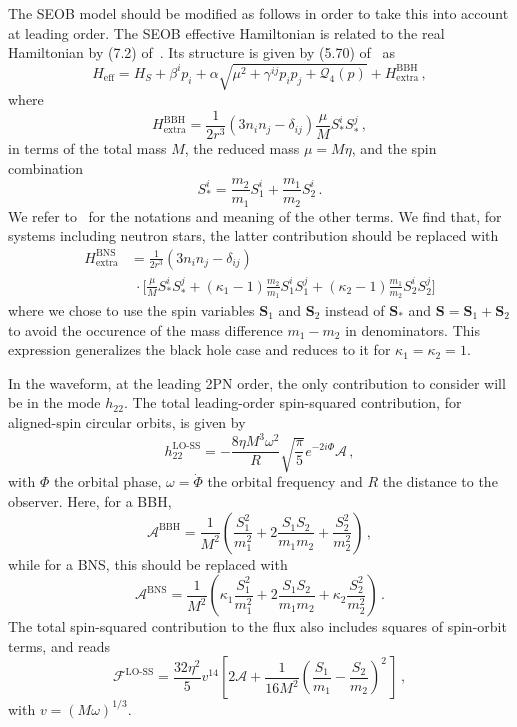 \documentclass[prd,aps,letter,twocolumn,floatfix,notitlepage,nofootinbib]{revtex4-1}
\newcommand{\be}{\begin{equation}}
\newcommand{\ee}{\end{equation}}
\newcommand{\nnm}{\nonumber}
\newcommand{\mr}{\mathrm}
\newcommand{\tr}{\textrm}
\newcommand{\mc}{\mathcal}
\newcommand{\bs}{\boldsymbol}
\begin{document}
The SEOB model should be modified as follows in order to take this into account at leading order. The SEOB effective Hamiltonian is related to the real Hamiltonian by (7.2) of~\cite{Barausse:2009xi}. Its structure is given by (5.70) of~\cite{Barausse:2009xi} as
\be
H_\mr{eff}=H_S+\beta^ip_i+\alpha\sqrt{\mu^2+\gamma^{ij}p_ip_j+\mc Q_4(p)}+H^\mr{BBH}_\mr{extra} \,,
\ee
where
\be
H^\mr{BBH}_\mr{extra}=\frac{1}{2r^3}(3n_in_j-\delta_{ij})\frac{\mu}{M}S_*^iS_*^j \,,
\ee
in terms of the total mass $M$, the reduced mass $\mu = M \eta$, and the spin combination
\be	
	S_*^i=\frac{m_2}{m_1} S_1^i+\frac{m_1}{m_2}S_2^i \,.
\ee
We refer to~\cite{Barausse:2009xi} for the notations and meaning of the other terms. We find that, for systems including neutron stars, the latter contribution should be replaced with
\begin{align}
	H^\mr{BNS}_\mr{extra} &= \frac{1}{2r^3}(3n_in_j-\delta_{ij}) \nnm\\
	& \; \cdot \bigg[\frac{\mu}{M}S_*^iS_*^j+(\kappa_1-1)\frac{m_2}{m_1}S_1^i S_1^j+(\kappa_2-1)\frac{m_1}{m_2}S_2^i S_2^j\bigg] \label{eq:HBNSextra}
\end{align}
where we chose to use the spin variables $\bs S_1$ and $\bs S_2$ instead of $\bs S_*$ and $\bs S=\bs S_1+\bs S_2$ to avoid the occurence of the mass difference $m_{1} - m_{2}$ in denominators. This expression generalizes the black hole case and reduces to it for $\kappa_{1} = \kappa_{2} = 1$.

In the waveform, at the leading 2PN order, the only contribution to consider will be in the mode $h_{22}$. The total leading-order spin-squared contribution, for aligned-spin circular orbits, is given by~\cite{Kidder:1995zr, Will:1996zj, Buonanno:2012rv}
\be
h_{22}^\tr{LO-SS}=-\frac{8\eta M^3\omega^2}{R}\sqrt{\frac{\pi}{5}}e^{-2i\Phi}\mc A \,,
\ee
with $\Phi$ the orbital phase, $\omega = \dot{\Phi}$ the orbital frequency and $R$ the distance to the observer. Here, for a BBH,
\be\label{eq:ABBH}
\mc A^\mr{BBH}=\frac{1}{M^2}\left(\frac{S_1^2}{m_1^2}+2\frac{S_1S_2}{m_1m_2}+\frac{S_2^2}{m_2^2}\right) \,,
\ee
while for a BNS, this should be replaced with
\be\label{eq:ABNS}
\mc A^\mr{BNS}=\frac{1}{M^2}\left(\kappa_1\frac{S_1^2}{m_1^2}+2\frac{S_1S_2}{m_1m_2}+\kappa_2\frac{S_2^2}{m_2^2}\right) \,.
\ee
The total spin-squared contribution to the flux also includes squares of spin-orbit terms, and reads~\cite{Kidder:1995zr, Will:1996zj, Poisson1998}
\be
\mc F^\tr{LO-SS}=\frac{32\eta^2}{5} v^{14} \left[2\mc A+\frac{1}{16M^2}\left(\frac{S_1}{m_1}-\frac{S_2}{m_2}\right)^2\,\right] \,,
\ee
with $v=(M\omega)^{1/3}$.
\end{document}
